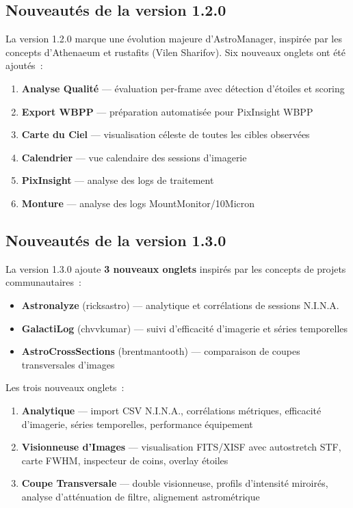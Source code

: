 \documentclass[a4paper,11pt]{article}
\begin{document}
\subsection{Nouveaut\'{e}s de la version 1.2.0}

La version 1.2.0 marque une \'{e}volution majeure d'AstroManager, inspir\'{e}e par les concepts d'Athenaeum et rustafits (Vilen Sharifov). Six nouveaux onglets ont \'{e}t\'{e} ajout\'{e}s~:

\begin{enumerate}
    \item \textbf{Analyse Qualit\'{e}} --- \'{e}valuation per-frame avec d\'{e}tection d'\'{e}toiles et scoring
    \item \textbf{Export WBPP} --- pr\'{e}paration automatis\'{e}e pour PixInsight WBPP
    \item \textbf{Carte du Ciel} --- visualisation c\'{e}leste de toutes les cibles observ\'{e}es
    \item \textbf{Calendrier} --- vue calendaire des sessions d'imagerie
    \item \textbf{PixInsight} --- analyse des logs de traitement
    \item \textbf{Monture} --- analyse des logs MountMonitor/10Micron
\end{enumerate}

\subsection{Nouveaut\'{e}s de la version 1.3.0}

\begin{newfeaturebox}
La version 1.3.0 ajoute \textbf{3 nouveaux onglets} inspir\'{e}s par les concepts de projets communautaires~:
\begin{itemize}
    \item \textbf{Astronalyze} (ricksastro) --- analytique et corr\'{e}lations de sessions N.I.N.A.
    \item \textbf{GalactiLog} (chvvkumar) --- suivi d'efficacit\'{e} d'imagerie et s\'{e}ries temporelles
    \item \textbf{AstroCrossSections} (brentmantooth) --- comparaison de coupes transversales d'images
\end{itemize}
\end{newfeaturebox}

Les trois nouveaux onglets~:

\begin{enumerate}
    \item \textbf{Analytique} --- import CSV N.I.N.A., corr\'{e}lations m\'{e}triques, efficacit\'{e} d'imagerie, s\'{e}ries temporelles, performance \'{e}quipement
    \item \textbf{Visionneuse d'Images} --- visualisation FITS/XISF avec autostretch STF, carte FWHM, inspecteur de coins, overlay \'{e}toiles
    \item \textbf{Coupe Transversale} --- double visionneuse, profils d'intensit\'{e} miroir\'{e}s, analyse d'att\'{e}nuation de filtre, alignement astrom\'{e}trique
\end{enumerate}
\end{document}
